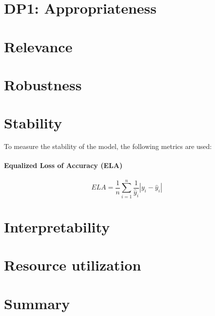 \section{DP1: Appropriateness}



\section{Relevance}


\section{Robustness}


\section{Stability}
To measure the stability of the model, the following metrics are used:

\paragraph*{Equalized Loss of Accuracy (ELA)}

\begin{equation}
    \label{eq:ela}
    ELA = \frac{1}{n} \sum_{i=1}^{n} \frac{1}{\hat{y}_i} |y_i - \hat{y}_i|
\end{equation}




\section{Interpretability}

\section{Resource utilization}







\section{Summary}